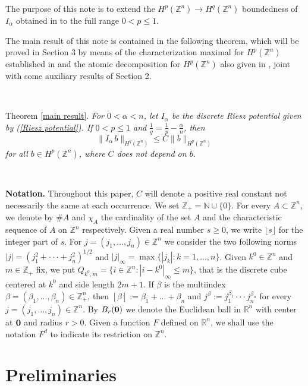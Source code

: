 \documentclass[leqno,12pt]{article} %
\theoremstyle{plain} %
\theoremstyle{definition} %
\begin{document}
The purpose of this note is to extend the $H^p(\mathbb{Z}^n) \to H^q(\mathbb{Z}^n)$ boundedness of $I_{\alpha}$ obtained in \cite{Rocha2} to the full range $0 < p \leq 1$.

The main result of this note is contained in the following theorem, which will be proved in Section 3 by means of the characterization 
maximal for $H^p(\mathbb{Z}^n)$ established in \cite[Theorem 2.7]{Carro} and the atomic decomposition for $H^p(\mathbb{Z}^n)$ also given in \cite{Carro}, joint with some auxiliary results of Section 2.

\

{\sc Theorem} \ref{main result}.
{\it For $0 < \alpha < n$, let $I_{\alpha}$ be the discrete Riesz potential given by (\ref{Riesz potential}). If
$0 < p \leq 1$ and $\frac{1}{q} = \frac{1}{p} - \frac{\alpha}{n}$, then
\[
\| I_{\alpha} \, b \|_{H^{q}(\mathbb{Z}^n)} \leq C \| b \|_{H^{p}(\mathbb{Z}^n)}
\]
for all $b \in H^{p}(\mathbb{Z}^n)$, where $C$ does not depend on $b$.}

\

{\bf Notation.} Throughout this paper, $C$ will denote a positive real constant not necessarily the same at each occurrence. We set 
$\mathbb{Z}_{+} = \mathbb{N} \cup \{0\}$. For every $A \subset \mathbb{Z}^n$, we denote by $\#A$ and $\chi_{A}$ the cardinality of 
the set $A$ and the characteristic sequence of $A$ on $\mathbb{Z}^n$ respectively. Given a real number $s \geq 0$, we write 
$\lfloor s \rfloor$ for the integer part of $s$. For $j=(j_1, ..., j_n) \in \mathbb{Z}^n$ we consider the two following norms 
$|j| = (j_1^2 + \cdot \cdot \cdot + j_n^2)^{1/2}$ and $|j|_{\infty} = \max \{ |j_k| : k = 1, ..., n \}$. Given $k^0 \in \mathbb{Z}^n$ and 
$m \in \mathbb{Z}_{+}$ fix, we put $Q_{k^0, m} = \{ i \in \mathbb{Z}^n : |i - k^0|_{\infty} \leq m \}$, that is the discrete cube centered 
at $k^0$ and side length $2m + 1$. If $\beta$ is the multiindex $\beta =(\beta_{1},...,\beta _{n}) \in \mathbb{Z}_{+}^{n}$, then 
$[\beta] :=\beta _{1}+...+\beta _{n}$ and $j^{\beta} := j_{1}^{\beta_1} \cdot \cdot \cdot j_{n}^{\beta_n}$ for every $j=(j_1, ..., j_n) \in \mathbb{Z}^n$. By $B_r({\bf 0 })$ we denote the Euclidean ball in $\mathbb{R}^n$ with center at ${\bf 0 }$ and radius $r > 0$. Given a function $F$ defined on $\mathbb{R}^n$, we shall use the notation $F^d$ to indicate its restriction on $\mathbb{Z}^n$. 

\section{Preliminaries}
\end{document}
